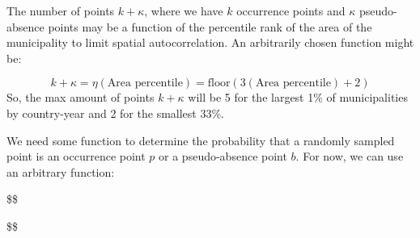 \documentclass[
]{article}
\begin{document}
The number of points \(k + \kappa\), where we have \(k\) occurrence
points and \(\kappa\) pseudo-absence points may be a function of the
percentile rank of the area of the municipality to limit spatial
autocorrelation. An arbitrarily chosen function might be:

\[
k + \kappa = \eta(\text{Area percentile}) = \text{floor}(3(\text{Area percentile}) + 2)
\] So, the max amount of points \(k + \kappa\) will be 5 for the largest
1\% of municipalities by country-year and 2 for the smallest 33\%.

We need some function to determine the probability that a randomly
sampled point is an occurrence point \(p\) or a pseudo-absence point
\(b\). For now, we can use an arbitrary function:

\$\$

\$\$
\end{document}
